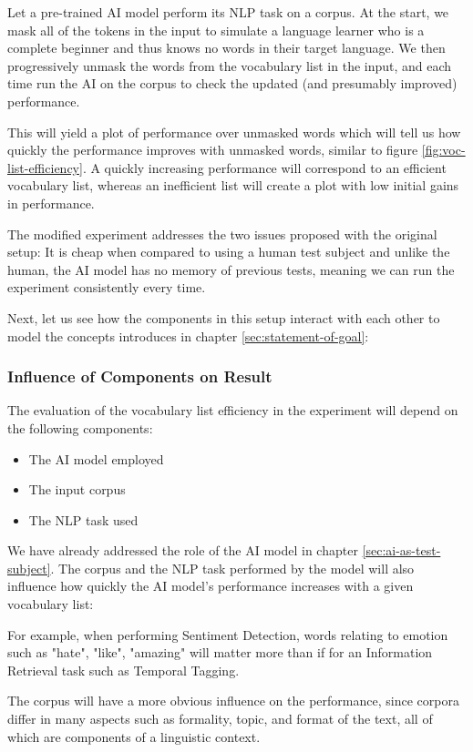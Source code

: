 Let a pre-trained AI model perform its NLP task on a corpus.
At the start, we mask all of the tokens in the input to simulate a language learner who is a complete beginner and thus knows no words in their target language.
We then progressively unmask the words from the vocabulary list in the input, and each time run the AI on the corpus to check the updated (and presumably improved) performance.

This will yield a plot of performance over unmasked words which will tell us how quickly the performance improves with unmasked words, similar to figure \ref{fig:voc-list-efficiency}.
A quickly increasing performance will correspond to an efficient vocabulary list, whereas an inefficient list will create a plot with low initial gains in performance.

The modified experiment addresses the two issues proposed with the original setup:
It is cheap when compared to using a human test subject and unlike the human, the AI model has no memory of previous tests, meaning we can run the experiment consistently every time.


Next, let us see how the components in this setup interact with each other to model the concepts introduces in chapter \ref{sec:statement-of-goal}:

\subsubsection{Influence of Components on Result}
The evaluation of the vocabulary list efficiency in the experiment will depend on the following components:

\begin{itemize}
	\item The AI model employed
	\item The input corpus
	\item The NLP task used
\end{itemize}

We have already addressed the role of the AI model in chapter \ref{sec:ai-as-test-subject}.
The corpus and the NLP task performed by the model will also influence how quickly the AI model's performance increases with a given vocabulary list:

For example, when performing Sentiment Detection, words relating to emotion such as "hate", "like", "amazing" will matter more than if for an Information Retrieval task such as Temporal Tagging.

The corpus will have a more obvious influence on the performance, since corpora differ in many aspects such as formality, topic, and format of the text, all of which are components of a linguistic context.

